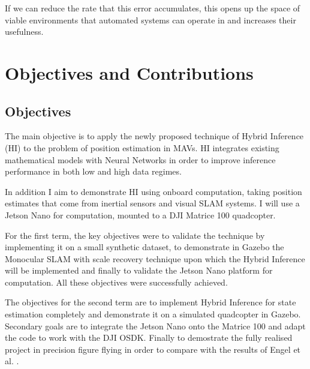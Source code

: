 \documentclass[]{../resources/final_report}
\begin{document}
If we can reduce the rate that this error accumulates, this opens up the space of viable environments
that automated systems can operate in and increases their usefulness.


\section{Objectives and Contributions}

\subsection{Objectives}
The main objective is to apply the newly proposed technique of Hybrid Inference (HI)
\cite{Satorras2019CombiningGA} to the problem of position estimation in MAVs. HI integrates 
existing mathematical models with Neural Networks in order to improve inference performance in 
both low and high data regimes.

In addition I aim to demonstrate HI using onboard computation, taking position estimates that 
come from inertial sensors and visual SLAM systems. I will use a Jetson Nano for computation, 
mounted to a DJI Matrice 100 quadcopter.

For the first term, the key objectives were to validate the technique by implementing it on a 
small synthetic dataset, to demonstrate in Gazebo the Monocular SLAM with scale recovery technique 
\cite{Engel:Camera-basedNav} upon which the Hybrid Inference will be implemented and finally to 
validate the Jetson Nano platform for computation. All these objectives were successfully achieved.

The objectives for the second term are to implement Hybrid Inference for state estimation completely 
and demonstrate it on a simulated quadcopter in Gazebo. Secondary goals are to integrate the 
Jetson Nano onto the Matrice 100 and adapt the code to work with the DJI OSDK. Finally to demostrate 
the fully realised project in precision figure flying in order to compare with the results of 
Engel et al. \cite{Engel:FigureFlying}.

\end{document}
